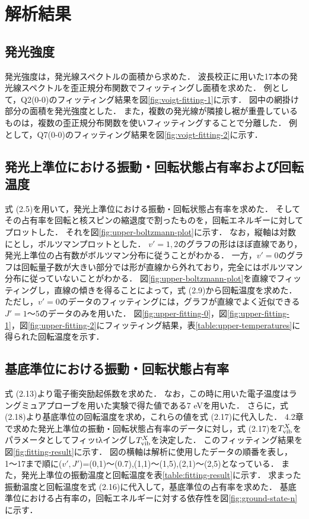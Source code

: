 \chapter{解析結果}

\section{発光強度}
発光強度は，発光線スペクトルの面積から求めた．
波長校正に用いた17本の発光線スペクトルを歪正規分布関数でフィッティングし面積を求めた．
例として，Q2(0-0)のフィッティング結果を図\ref{fig:voigt-fitting-1}に示す．
図中の網掛け部分の面積を発光強度とした．
また，複数の発光線が隣接し裾が重畳しているものは，複数の歪正規分布関数を使いフィッティングすることで分離した．
例として，Q7(0-0)のフィッティング結果を図\ref{fig:voigt-fitting-2}に示す．

\section{発光上準位における振動・回転状態占有率および回転温度}
式 (2.5)を用いて，発光上準位における振動・回転状態占有率を求めた．
そしてその占有率を回転と核スピンの縮退度で割ったものを，回転エネルギーに対してプロットした．
それを図\ref{fig:upper-boltzmann-plot}に示す．
なお，縦軸は対数にとし，ボルツマンプロットとした．
$v'=1,2$のグラフの形はほぼ直線であり，発光上準位の占有数がボルツマン分布に従うことがわかる．
一方，$v'=0$のグラフは回転量子数が大きい部分では形が直線から外れており，完全にはボルツマン分布に従っていないことがわかる．
図\ref{fig:upper-boltzmann-plot}を直線でフィッティングし，直線の傾きを得ることによって，式 (2.9)から回転温度を求めた．
ただし，$v'=0$のデータのフィッティングには，グラフが直線でよく近似できる$J'=1〜5$のデータのみを用いた．
図\ref{fig:upper-fitting-0}，図\ref{fig:upper-fitting-1}，図\ref{fig:upper-fitting-2}にフィッティング結果，表\ref{table:upper-temperatures}に得られた回転温度を示す．

\section{基底準位における振動・回転状態占有率}
式 (2.13)より電子衝突励起係数を求めた．
なお，この時に用いた電子温度はラングミュアプローブを用いた実験で得た値である7 eV\cite{yun}を用いた．
さらに，式 (2.18)より基底準位の回転温度を求め，これらの値を式 (2.17)に代入した．
4.2章で求めた発光上準位の振動・回転状態占有率のデータに対し，式 (2.17)を$T^X_{\rm vib}$をパラメータとしてフィッtλイングし$T^X_{\rm vib}$を決定した．
このフィッティング結果を図\ref{fig:fitting-result}に示す．
図の横軸は解析に使用したデータの順番を表し，1〜17まで順に($v',J'$)=(0,1)〜(0.7),(1,1)〜(1,5),(2,1)〜(2,5)となっている．
また，発光上準位の振動温度と回転温度を表\ref{table:fitting-result}に示す．
求まった振動温度と回転温度を式 (2.16)に代入して，基底準位の占有率を求めた．
基底準位における占有率の，回転エネルギーに対する依存性を図\ref{fig:ground-state-n}に示す．